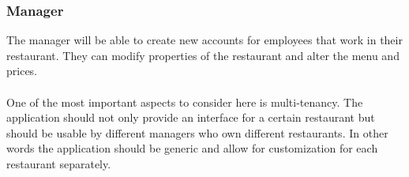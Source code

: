 \documentclass[12pt]{article}
\begin{document}
\begin{multicols}{2}
\subsubsection{Manager}
The manager will be able to create new accounts for employees that work in their restaurant. They can modify properties of the restaurant and alter the menu and prices. 
\\\\
One of the most important aspects to consider here is multi-tenancy. The application should not only provide an interface for a certain restaurant but should be usable by different managers who own different restaurants. In other words the application should be generic and allow for customization for each restaurant separately.

\end{multicols}
\end{document}

